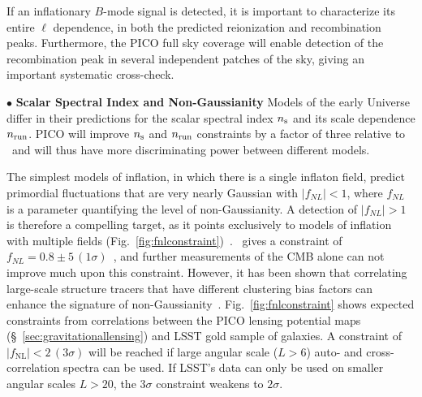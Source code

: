 \documentclass[PICOReport.tex]{subfiles}
\begin{document}
If an inflationary $B$-mode signal is detected, it is important to characterize its entire $\ell$ dependence, in both the predicted reionization and  recombination peaks.  Furthermore, the PICO full sky coverage will enable detection of the recombination peak in several independent patches of the sky, giving an important systematic cross-check. 

\noindent$\bullet$ {\bf Scalar Spectral Index and Non-Gaussianity} \hspace{0.1in} Models of the early Universe  differ in their predictions for the scalar spectral index $n_{\rm s}$ and its scale dependence $n_{\rm run}$. PICO will improve $n_{\rm s}$ and $n_{\rm run}$ constraints by a factor of three relative to \planck\ and will thus have more discriminating power between different models. 

The simplest models of inflation, in which there is a single inflaton field, predict primordial fluctuations that are very nearly Gaussian with $|f_{NL}| <1$, where $f_{NL}$ is a parameter quantifying the level of non-Gaussianity. A detection of $|f_{NL}| >1$ is therefore a compelling target, as it points exclusively to models of inflation with multiple fields (Fig.~\ref{fig:fnlconstraint})~\citep{2014arXiv1412.4671A}. \planck\ gives a constraint of $f_{NL} = 0.8 \pm 5 \, (1\sigma)$~\citep{planck2015_17}, and further measurements of the \ac{CMB} alone can not improve much upon this constraint. However, it has been shown that correlating large-scale structure tracers that have different clustering bias factors can enhance the signature of non-Gaussianity~\citep{2009PhRvL.102b1302S,2018PhRvD..97l3540S,2008PhRvD..77l3514D}. Fig.~\ref{fig:fnlconstraint} shows expected constraints from correlations between the PICO lensing potential maps (\S~\ref{sec:gravitationallensing}) and LSST gold sample of galaxies. A constraint of $|f_\mathrm{NL}| < 2 \, (3\sigma)$ will be reached if large angular scale ($L>6$) auto- and cross-correlation spectra can be used. If LSST's data can only be used on smaller angular scales $L>20$, the $3\sigma$ constraint weakens to $2\sigma$. 
\end{document}
